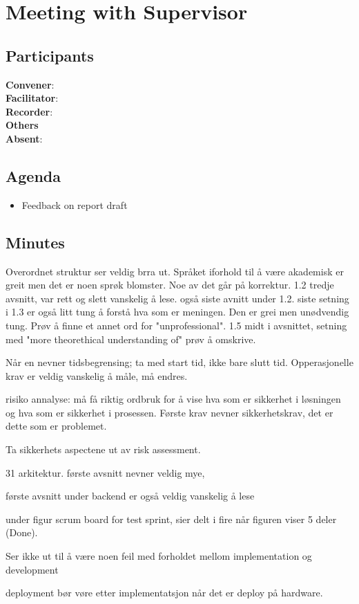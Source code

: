 \section*{Meeting with Supervisor}

\subsection*{Participants}

\textbf{Convener}: \supervisor{}        \\
\textbf{Facilitator}: \groupleader{}    \\
\textbf{Recorder}: \scrummaster{}       \\
\textbf{Others}                         \\
\textbf{Absent}: \facilitator{}

\subsection*{Agenda}
\begin{itemize}
    \item Feedback on report draft

\end{itemize}

\subsection*{Minutes}

Overordnet struktur ser veldig brra ut. Språket iforhold til å være akademisk er greit men det er noen sprøk blomster. Noe av det går på korrektur. 1.2 tredje avsnitt, var rett og slett vanskelig å lese. også siste avnitt under 1.2. siste setning i 1.3 er også litt tung å forstå hva som er meningen. Den er grei men unødvendig tung. Prøv å finne et annet ord for "unprofessional". 1.5 midt i avsnittet, setning med "more theorethical understanding of" prøv å omskrive. 

Når en nevner tidsbegrensing; ta med start tid, ikke bare slutt tid.
Opperasjonelle krav er veldig vanskelig å måle, må endres.  

risiko annalyse: må få riktig ordbruk for å vise hva som er sikkerhet i løsningen og hva som er sikkerhet i prosessen. Første krav nevner sikkerhetskrav, det er dette som er problemet. 

Ta sikkerhets aspectene ut av risk assessment.

31 arkitektur. første avsnitt nevner veldig mye, 

første avsnitt under backend er også veldig vanskelig å lese

under figur scrum board for test sprint, sier delt i fire når figuren viser 5 deler (Done).

Ser ikke ut til å være noen feil med forholdet mellom  implementation og development

deployment bør vøre etter implementatsjon når det er deploy på hardware.
\newpage